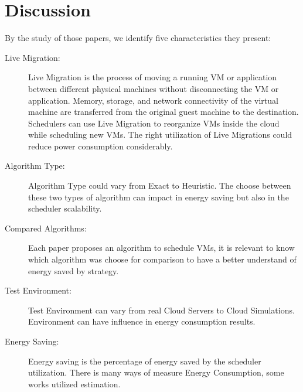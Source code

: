 \documentclass{article}
\begin{document}
\section{Discussion}
By the study of those papers, we identify five characteristics they present:

\begin{description}

    \item[Live Migration:] Live Migration is the process of moving a running VM or application between different physical machines without disconnecting the VM or application. Memory, storage, and network connectivity of the virtual machine are transferred from the original guest machine to the destination. Schedulers can use Live Migration to reorganize VMs inside the cloud while scheduling new VMs. The right  utilization of Live Migrations could reduce power consumption considerably.
    
    \item[Algorithm Type:] Algorithm Type could vary from Exact to Heuristic. The choose between these two types of algorithm can impact in energy saving but also in the scheduler scalability.
    
    \item[Compared Algorithms:] Each paper proposes an algorithm to schedule VMs, it is relevant to know which algorithm was choose for comparison to have a better understand of energy saved by strategy. 
    
    \item[Test Environment:] Test Environment can vary from real Cloud Servers to Cloud Simulations. Environment can have influence in energy consumption results.
    
    \item[Energy Saving:] Energy saving is the percentage of energy saved by the scheduler utilization. There is many ways of measure Energy Consumption, some works utilized estimation.

\end{description}



\end{document}

